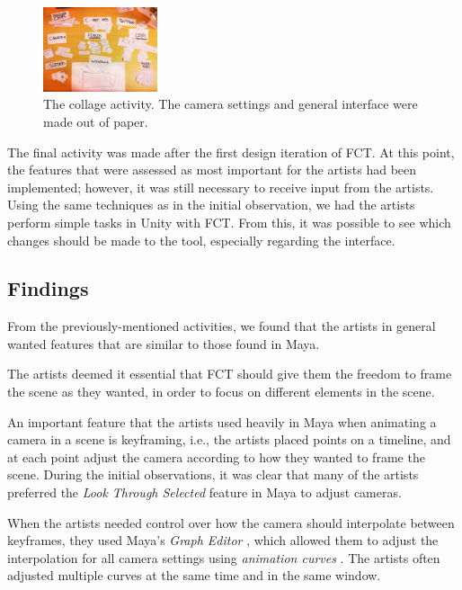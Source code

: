 \begin{figure}[htbp]
\centering
\includegraphics[width=0.3\textwidth]{Pics/labels}
\caption{The collage activity. The camera settings and general interface were made out of paper.}
\label{fig:collage}
\end{figure}

The final activity was made after the first design iteration of FCT. At this point, the features that were assessed as most important for the artists had been implemented; however, it was still necessary to receive input from the artists. Using the same techniques as in the initial observation, we had the artists perform simple tasks in Unity with FCT. From this, it was possible to see which changes should be made to the tool, especially regarding the interface.

\subsection{Findings} \label{findings}
From the previously-mentioned activities, we found that the artists in general wanted features that are similar to those found in Maya.

The artists deemed it essential that FCT should give them the freedom to frame the scene as they wanted, in order to focus on different elements in the scene.

An important feature that the artists used heavily in Maya when animating a camera in a scene is keyframing, i.e., the artists placed points on a timeline, and at each point adjust the camera according to how they wanted to frame the scene. During the initial observations, it was clear that many of the artists preferred the \textit{Look Through Selected} \cite{maya_lookThrough} feature in Maya to adjust cameras.

When the artists needed control over how the camera should interpolate between keyframes, they used Maya's \textit{Graph Editor} \cite{maya_graph}, which allowed them to adjust the interpolation for all camera settings using \textit{animation curves} \cite{maya_graph}. The artists often adjusted multiple curves at the same time and in the same window.

